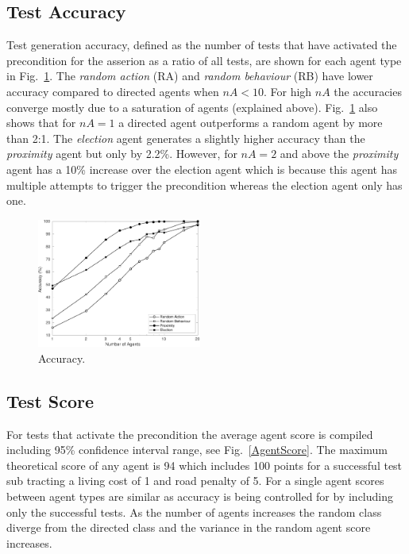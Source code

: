\documentclass[letterpaper, 10 pt, journal, twoside]{IEEEtran}
\begin{document}
\subsection{Test Accuracy}
Test generation accuracy, defined as the number of tests that have activated the precondition for the asserion as a ratio of all tests, are shown for each agent type in Fig.~\ref{Accuracy}. The \textit{random action} (RA) and \textit{random behaviour} (RB) have lower accuracy compared to directed agents when $nA<10$. For high $nA$ the accuracies converge mostly due to a saturation of agents (explained above).
%
Fig.~\ref{Accuracy} also shows that for $nA=1$ a directed agent outperforms a random agent by more than 2:1. The \textit{election} agent generates a slightly higher accuracy than the \textit{proximity} agent but only by 2.2\%. However, for $nA=2$ and above the \textit{proximity} agent has a 10\% increase over the election agent which is because this agent has multiple attempts to trigger the precondition whereas the election agent only has one.


\begin{figure}[!t]
	\centering
\includegraphics[width=0.48\textwidth]{Accuracy.pdf}
	\caption{Accuracy.}
	\label{Accuracy}
\end{figure}



\subsection{Test Score}
For tests that activate the precondition the average agent score is compiled including 95\% confidence interval range, see Fig.~\ref{AgentScore}. The maximum theoretical score of any agent is 94 which includes 100 points for a successful test sub tracting a living cost of 1 and road penalty of 5. For a single agent scores between agent types are similar as accuracy is being controlled for by including only the successful tests. As the number of agents increases the random class diverge from the directed class and the variance in the random agent score increases. 
\end{document}
